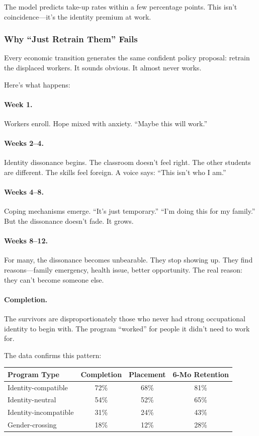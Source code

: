 The model predicts take-up rates within a few percentage points. 
This isn't coincidence---it's the identity premium at work.

\subsubsection{Why ``Just Retrain Them'' Fails}

Every economic transition generates the same confident policy proposal: 
retrain the displaced workers. It sounds obvious. It almost never works.

Here's what happens:

\paragraph{Week 1.}
Workers enroll. Hope mixed with anxiety. ``Maybe this will work.''

\paragraph{Weeks 2--4.}
Identity dissonance begins. The classroom doesn't feel right. The other 
students are different. The skills feel foreign. A voice says: ``This 
isn't who I am.''

\paragraph{Weeks 4--8.}
Coping mechanisms emerge. ``It's just temporary.'' ``I'm doing this for 
my family.'' But the dissonance doesn't fade. It grows.

\paragraph{Weeks 8--12.}
For many, the dissonance becomes unbearable. They stop showing up. They 
find reasons---family emergency, health issue, better opportunity. The 
real reason: they can't become someone else.

\paragraph{Completion.}
The survivors are disproportionately those who never had strong 
occupational identity to begin with. The program ``worked'' for 
people it didn't need to work for.

The data confirms this pattern:

\begin{center}
\renewcommand{\arraystretch}{1.2}
\begin{tabular}{lccc}
\hline
\textbf{Program Type} & \textbf{Completion} & \textbf{Placement} & \textbf{6-Mo Retention} \\
\hline
Identity-compatible & 72\% & 68\% & 81\% \\
Identity-neutral & 54\% & 52\% & 65\% \\
Identity-incompatible & 31\% & 24\% & 43\% \\
Gender-crossing & 18\% & 12\% & 28\% \\
\hline
\end{tabular}
\end{center}

